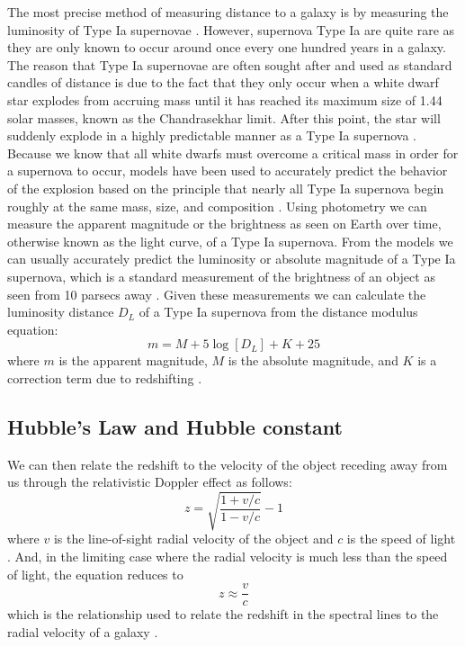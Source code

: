 The most precise method of measuring distance to a galaxy is by measuring the luminosity of Type Ia supernovae \cite{Branch1992:SNeIa+StandardCandles,Goobar1995:StandardCandles}. However, supernova Type Ia are quite rare as they are only known to occur around once every one hundred years in a galaxy. The reason that Type Ia supernovae are often sought after and used as standard candles of distance is due to the fact that they only occur when a white dwarf star explodes from accruing mass until it has reached its maximum size of 1.44 solar masses, known as the Chandrasekhar limit. After this point, the star will suddenly explode in a highly predictable manner as a Type Ia supernova \cite{Carroll2001-CosmoReview+SNeIa+Lum,Krisciunas2005:SNeIa,Narayan2016:SNeIa+Redshift}. Because we know that all white dwarfs must overcome a critical mass in order for a supernova to occur, models have been used to accurately predict the behavior of the explosion based on the principle that nearly all Type Ia supernova begin roughly at the same mass, size, and composition \cite{Goobar1995:StandardCandles}. Using photometry we can measure the apparent magnitude or the brightness as seen on Earth over time, otherwise known as the light curve, of a Type Ia supernova. From the models we can usually accurately predict the luminosity or absolute magnitude of a Type Ia supernova, which is a standard measurement of the brightness of an object as seen from 10 parsecs away \cite{Reiss2007:SNeIa}. Given these measurements we can calculate the luminosity distance $D_L$ of a Type Ia supernova from the distance modulus equation:
%
\begin{equation}\label{dm}
m = M + 5 \log [D_L] + K + 25
\end{equation}
%
where $m$ is the apparent magnitude, $M$ is the absolute magnitude, and $K$ is a correction term due to redshifting \cite{Carroll2001-CosmoReview+SNeIa+Lum,Narayan2016:SNeIa+Redshift}.


\subsection{Hubble's Law and Hubble constant}

We can then relate the redshift to the velocity of the object receding away from us through the relativistic Doppler effect as follows:
%
\begin{equation}\label{rds}
z = \sqrt{\frac{1+v/c}{1-v/c}} - 1
\end{equation}
%
where $v$ is the line-of-sight radial velocity of the object and $c$ is the speed of light \cite{Hogg1999:DistanceMeas+GenRef,Kirshner2004:HubbleDiagram,moore2012:general}. And, in the limiting case where the radial velocity is much less than the speed of light, the equation reduces to
%
\begin{equation}\label{redshift-radialvelo}
z \approx \frac{v}{c}
\end{equation}
%
which is the relationship used to relate the redshift in the spectral lines to the radial velocity of a galaxy \cite{Hogg1999:DistanceMeas+GenRef,moore2012:general}.

